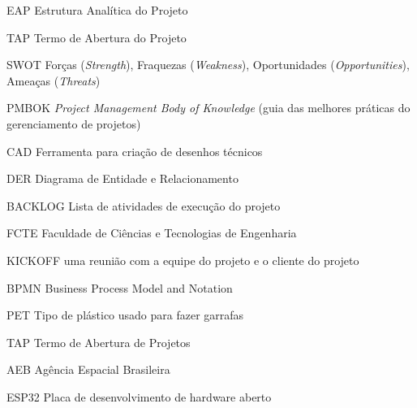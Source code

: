\begin{siglas}
	\item[EAP] Estrutura Analítica do Projeto
	\item[TAP] Termo de Abertura do Projeto
	\item[SWOT] Forças (\textit{Strength}), Fraquezas (\textit{Weakness}), Oportunidades (\textit{Opportunities}), Ameaças (\textit{Threats})
	\item[PMBOK] \textit{Project Management Body of Knowledge} (guia das melhores práticas do gerenciamento de projetos)
	\item[CAD] Ferramenta para criação de desenhos técnicos
	\item[DER] Diagrama de Entidade e Relacionamento
	\item[BACKLOG] Lista de atividades de execução do projeto
	\item[FCTE] Faculdade de Ciências e Tecnologias de Engenharia
	\item[KICKOFF] uma reunião com a equipe do projeto e o cliente do projeto
	\item[BPMN] Business Process Model and Notation
	\item[PET] Tipo de plástico usado para fazer garrafas
	\item[TAP] Termo de Abertura de Projetos
	\item[AEB] Agência Espacial Brasileira
	\item[ESP32] Placa de desenvolvimento de hardware aberto
\end{siglas}

